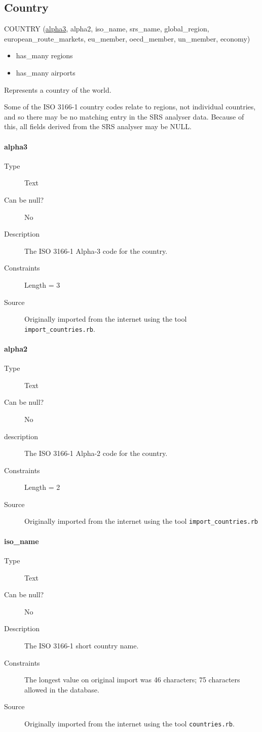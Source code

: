 \documentclass[]{report}
\begin{document}
\subsection{Country}
COUNTRY (\underline{alpha3}, alpha2, iso\_name, srs\_name, global\_region, european\_route\_markets, eu\_member, oecd\_member, un\_member, economy)
\begin{itemize}
\item has\_many regions
\item has\_many airports
\end{itemize}
Represents a country of the world. 

Some of the ISO 3166-1 country codes relate to regions, not individual countries, and so there may be no matching entry in the SRS analyser data. Because of this, all fields derived from the SRS analyser may be NULL.
\paragraph{alpha3} 
	\begin{description}
	\item[Type]Text
	\item[Can be null?]No
	\item[Description]The ISO 3166-1 Alpha-3 code for the country.
	\item[Constraints]Length = 3
	\item[Source]Originally imported from the internet using the tool \texttt{import\_countries.rb}.
\end{description}
\paragraph{alpha2}
	\begin{description}
	\item[Type] Text
	\item[Can be null?] No
	\item[description] The ISO 3166-1 Alpha-2 code for the country.
	\item[Constraints] Length = 2
	\item[Source] Originally imported from the internet using the tool \texttt{import\_countries.rb}
	\end{description}
\paragraph{iso\_name}
	\begin{description}
	\item[Type]Text
	\item[Can be null?]No
	\item[Description]The ISO 3166-1 short country name. 
	\item[Constraints]The longest value on original import was 46 characters; 75 characters allowed in the database.
	\item[Source]Originally imported from the internet using the tool \texttt{countries.rb}.
	\end{description}
\end{document}
